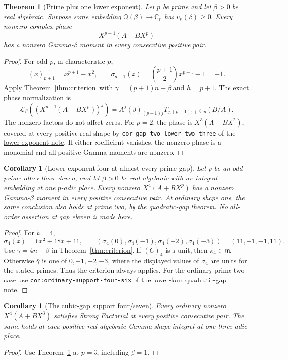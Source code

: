 \documentclass[11pt]{article}
\newtheorem{theorem}[lemma]{Theorem}
\newtheorem{corollary}[lemma]{Corollary}
\begin{document}
\begin{theorem}[Prime plus one lower exponent]\label{thm:family}
Let $p$ be prime and let $\beta>0$ be real algebraic.
Suppose some embedding $\mathbb Q(\beta)\longrightarrow\mathbb C_p$
has $v_p(\beta)\ge0$.
Every nonzero complex phase
\[
                         X^{p+1}(A+BX^p)
\]
has a nonzero Gamma-$\beta$ moment in every consecutive positive pair.
\end{theorem}
\begin{proof}
For odd $p$, in characteristic $p$,
\[
 (x)_{p+1}=x^{p+1}-x^2,\qquad
 \sigma_{p+1}(x)=\binom{p+1}{2}x^{p-1}-1=-1.
\]
Apply Theorem~\ref{thm:criterion} with
$\gamma=(p+1)n+\beta$ and $h=p+1$.
The exact phase normalization is
\[
 \mathcal L_\beta((X^{p+1}(A+BX^p))^j)
 =A^j(\beta)_{(p+1)j}T_{j,(p+1)j+\beta,p}(B/A).
\]
The nonzero factors do not affect zeros.
For $p=2$, the phase is $X^3(A+BX^2)$, covered at every positive
real shape by
\texttt{cor:gap-two-}\allowbreak\texttt{lower-two-three} of the
\href{lower_exponent_initial_and_boundary.tex}{lower-exponent note}. If either coefficient vanishes, the nonzero
phase is a monomial and all positive Gamma moments are nonzero.
\end{proof}

\begin{corollary}[Lower exponent four at almost every prime gap]
\label{cor:lower-four-prime}
Let $p$ be an odd prime other than eleven, and let $\beta>0$ be
real algebraic with an integral embedding at one $p$-adic place.
Every nonzero $X^4(A+BX^p)$ has a nonzero Gamma-$\beta$ moment in
every positive consecutive pair.
At ordinary shape one, the same conclusion also holds at prime
two, by the quadratic-gap theorem.
No all-order assertion at gap eleven is made here.
\end{corollary}
\begin{proof}
For $h=4$,
\[
 \sigma_4(x)=6x^2+18x+11,\qquad
 (\sigma_4(0),\sigma_4(-1),\sigma_4(-2),\sigma_4(-3))
       =(11,-1,-1,11).
\]
Use $\gamma=4n+\beta$ in Theorem~\ref{thm:criterion}.
If $(C)_4$ is a unit, then $\kappa_4\in\mathfrak m$.
Otherwise $\bar\gamma$ is one of $0,-1,-2,-3$, where the displayed
values of $\sigma_4$ are units for the stated primes.
Thus the criterion always applies.
For the ordinary prime-two case use
\texttt{cor:ordinary-support-}\allowbreak\texttt{four-six} of the
\href{LOWER_FOUR_QUADRATIC_GAP_SFC.tex}{lower-four quadratic-gap note}.
\end{proof}

\begin{corollary}[The cubic-gap support four/seven]\label{cor:four-seven}
Every ordinary nonzero $X^4(A+BX^3)$ satisfies Strong Factorial at
every positive consecutive pair. The same holds at each positive
real algebraic Gamma shape integral at one three-adic place.
\end{corollary}
\begin{proof}
Use Theorem~\ref{thm:family} at $p=3$, including $\beta=1$.
\end{proof}
\end{document}
